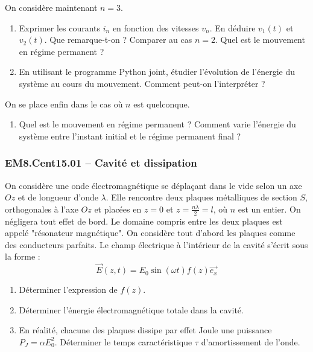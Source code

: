 On considère maintenant $n=3$.

\begin{enumerate}[resume]
\item Exprimer les courants $i_n$ en fonction des vitesses $v_n$. En déduire $v_1(t)$ et $v_2(t)$. Que remarque-t-on ? Comparer au cas $n=2$. Quel est le mouvement en régime permanent ?
\item En utilisant le programme Python joint, étudier l'évolution de l'énergie du système au cours du mouvement. Comment peut-on l'interpréter ?
\end{enumerate}

On se place enfin dans le cas où $n$ est quelconque.

\begin{enumerate}[resume]
\item Quel est le mouvement en régime permanent ? Comment varie l'énergie du système entre l'instant initial et le régime permanent final ?
\end{enumerate}


\newpage
\subsubsection*{EM8.Cent15.01 -- Cavité et dissipation  \lesdeux}

On considère une onde électromagnétique se déplaçant dans le vide selon un axe $Oz$ et de longueur d'onde $\lambda$. Elle rencontre deux plaques métalliques de section $S$, orthogonales à l'axe $Oz$ et placées en $z=0$ et $z = \frac{n\lambda}{2} = l$, où $n$ est un entier. On négligera tout effet de bord. Le domaine compris entre les deux plaques est appelé "résonateur magnétique". On considère tout d'abord les plaques comme des conducteurs parfaits. Le champ électrique à l'intérieur de la cavité s'écrit sous la forme : $$\overrightarrow{E}(z, t) = E_0 \sin(\omega t) f(z) \overrightarrow{e_x}$$

\begin{enumerate}
    \item Déterminer l'expression de $f(z)$.
    \item Déterminer l'énergie électromagnétique totale dans la cavité.
    \item En réalité, chacune des plaques dissipe par effet Joule une puissance $P_J = \alpha E_0^2$. Déterminer le temps caractéristique $\tau$ d'amortissement de l'onde.
\end{enumerate}

